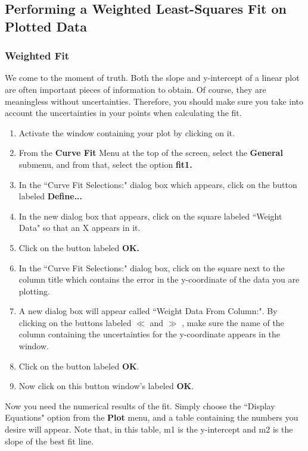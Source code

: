 \subsection{Performing a Weighted Least-Squares Fit on Plotted Data}
\subsubsection{Weighted Fit}

We come to the moment of truth. Both the slope and y-intercept of a
linear plot are often important pieces of information to obtain. Of
course, they are meaningless without uncertainties. Therefore, you
should make sure you take into account the uncertainties in your
points when calculating the fit.

\noindent
\begin{enumerate}
\item Activate the window containing your plot by clicking on it.
\item From the {\bf Curve Fit} Menu at the top of the screen, select the {\bf General}
submenu, and from that, select the option {\bf fit1.}
\item In the ``Curve Fit Selections:" dialog box which appears, click on the button
labeled {\bf Define...}
\item In the new dialog box that appears, click on the square labeled ``Weight Data"
so that an X appears in it.
\item Click on the button labeled {\bf OK.}
\item In the ``Curve Fit Selections:" dialog box, click on the square next to the
column title which contains the error in the
y-coordinate of the data you are
plotting.
\item A new dialog box will appear called ``Weight Data From Column:". By clicking on
the buttons labeled $\ll$ and $\gg$ , make sure the name of the
column containing the uncertainties for the y-coordinate appears in
the window.
\item Click on the button labeled {\bf OK}.
\item Now click on this button window's labeled {\bf OK}.
\end{enumerate}
\indent

Now you need the numerical results of the fit. Simply choose the
``Display Equations" option from the {\bf Plot} menu, and a table
containing the numbers you desire will appear. Note that, in this
table, m1 is the y-intercept and m2 is the slope of the best fit line.

